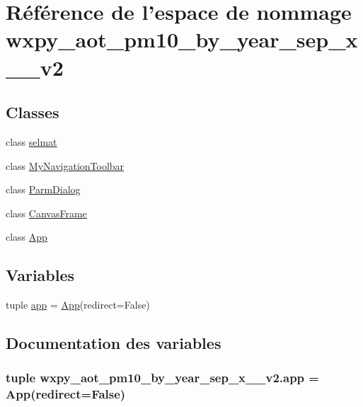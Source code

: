 \hypertarget{namespacewxpy__aot__pm10__by__year__sep__x__2009__v2}{\section{Référence de l'espace de nommage wxpy\-\_\-aot\-\_\-pm10\-\_\-by\-\_\-year\-\_\-sep\-\_\-x\-\_\-\_\-v2}
\label{namespacewxpy__aot__pm10__by__year__sep__x__2009__v2}
}
\subsection*{Classes}
\begin{DoxyCompactItemize}
\item 
class \hyperlink{classwxpy__aot__pm10__by__year__sep__x__2009__v2_1_1selmat}{selmat}
\item 
class \hyperlink{classwxpy__aot__pm10__by__year__sep__x__2009__v2_1_1_my_navigation_toolbar}{My\-Navigation\-Toolbar}
\item 
class \hyperlink{classwxpy__aot__pm10__by__year__sep__x__2009__v2_1_1_parm_dialog}{Parm\-Dialog}
\item 
class \hyperlink{classwxpy__aot__pm10__by__year__sep__x__2009__v2_1_1_canvas_frame}{Canvas\-Frame}
\item 
class \hyperlink{classwxpy__aot__pm10__by__year__sep__x__2009__v2_1_1_app}{App}
\end{DoxyCompactItemize}
\subsection*{Variables}
\begin{DoxyCompactItemize}
\item 
tuple \hyperlink{namespacewxpy__aot__pm10__by__year__sep__x__2009__v2_ab35478ac0294be440bd6850a9d621f87}{app} = \hyperlink{classwxpy__aot__pm10__by__year__sep__x__2009__v2_1_1_app}{App}(redirect=False)
\end{DoxyCompactItemize}


\subsection{Documentation des variables}
\hypertarget{namespacewxpy__aot__pm10__by__year__sep__x__2009__v2_ab35478ac0294be440bd6850a9d621f87}{
\subsubsection[{app}]{\setlength{\rightskip}{0pt plus 5cm}tuple wxpy\-\_\-aot\-\_\-pm10\-\_\-by\-\_\-year\-\_\-sep\-\_\-x\-\_\-\_\-v2.\-app = {\bf App}(redirect=False)}}\label{namespacewxpy__aot__pm10__by__year__sep__x__2009__v2_ab35478ac0294be440bd6850a9d621f87}
